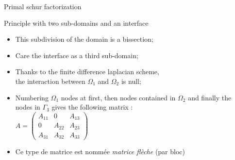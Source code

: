 \documentclass[compress,10pt,aspectratio=169]{beamer}
\begin{document}
\begin{frame}{Primal schur factorization}
  \scriptsize
  \begin{block}{Principle with two sub-domains and an interface}
    \begin{multicols}{2}
    \begin{figure}[h]
    \end{figure}

    \begin{itemize}
      \item This subdivision of the domain is a bissection;
      \item Care the interface as a third sub-domain;
      \item Thanks to the finite difference laplacian scheme,\\
      the interaction between $\Omega_{1}$ and $\Omega_{2}$ is null;
      \item Numbering $\Omega_{1}$ nodes at first, then nodes contained in
      $\Omega_{2}$ and finally the nodes in $\Gamma_{3}$ gives the following matrix :\\
      $A = \left(\begin{array}{ccc}
          A_{11} & 0 & A_{13} \\
            0    & A_{22} & A_{23} \\
            A_{31} & A_{32} & A_{33}
      \end{array}\right)$
      \item Ce type de matrice est nommée \textsl{matrice flèche} (par bloc)
    \end{itemize}
  \end{multicols}
  \end{block}
\end{frame}
\end{document}
